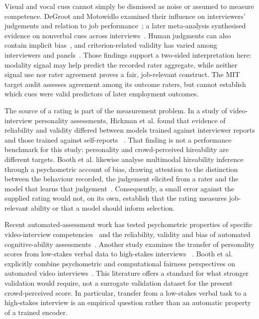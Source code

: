 Visual and vocal cues cannot simply be dismissed as noise or assumed to measure competence.
DeGroot and Motowidlo examined their influence on interviewers' judgements and relation to job
performance~\cite{DeGroot1999Cues}; a later meta-analysis synthesised evidence on nonverbal
cues across interviews~\cite{MartinRaugh2023Nonverbal}. Human judgments can also contain implicit
bias~\cite{Purkiss2006InterviewBias}, and criterion-related validity has varied among interviewers
and panels~\cite{VanIddekinge2006Interviewers}. Those findings support a
two-sided interpretation here: modality signal may help predict the recorded rater aggregate,
while neither signal use nor rater agreement proves a fair, job-relevant construct. The MIT
target audit assesses agreement among its outcome raters, but cannot establish which cues were
valid predictors of later employment outcomes.

The source of a rating is part of the measurement problem. In a study of video-interview
personality assessments, Hickman et al. found that evidence of reliability and validity differed
between models trained against interviewer reports and those trained against self-reports
~\cite{Hickman2022}. That finding is not a performance benchmark for this study: personality and
crowd-perceived hireability are different targets. Booth et al. likewise analyse multimodal
hireability inference through a psychometric account of bias, drawing attention to the distinction
between the behaviour recorded, the judgement elicited from a rater and the model that learns that
judgement~\cite{Booth2021}. Consequently, a small error against the supplied rating would not, on
its own, establish that the rating measures job-relevant ability or that a model should inform
selection.

Recent automated-assessment work has tested psychometric properties of specific video-interview
competencies~\cite{Liff2024Competency} and the reliability, validity and bias of automated
cognitive-ability assessments~\cite{Hickman2025Cognitive}. Another study examines the transfer
of personality scores from low-stakes verbal data to high-stakes interviews
~\cite{Stevenor2024HighStakes}. Booth et al. explicitly combine psychometric and computational fairness perspectives on
automated video interviews~\cite{Booth2021Psychometrics}. This literature offers a standard
for what stronger validation would require, not a surrogate validation dataset for the present
crowd-perceived score. In particular, transfer from a low-stakes verbal task to a high-stakes
interview is an empirical question rather than an automatic property of a trained encoder.

